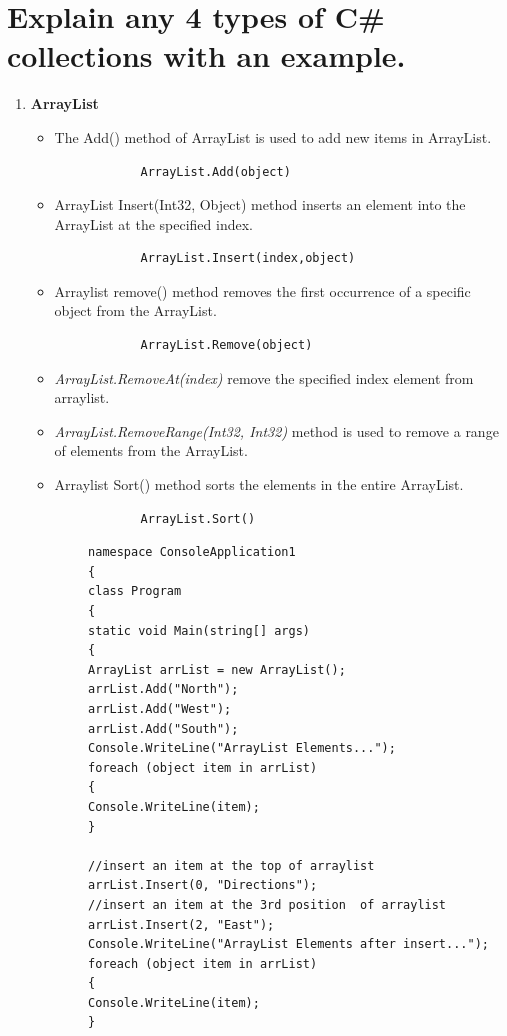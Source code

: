 \documentclass[11pt,dvipsnames,cmyk]{article}
\begin{document}
	 \section*{Explain any 4 types of C\# collections with an example.}
	 \begin{enumerate}
	 	\item \textbf{ArrayList}
	 	\begin{itemize}
	 		\item The Add() method of ArrayList is used to add new items in ArrayList.
	 		\begin{verbatim}
	 		ArrayList.Add(object)
	 		\end{verbatim}
	 		\item ArrayList Insert(Int32, Object) method inserts an element into the ArrayList at the specified index.
	 		\begin{verbatim}
	 		ArrayList.Insert(index,object)
	 		\end{verbatim}
	 		\item Arraylist remove() method removes the first occurrence of a specific object from the ArrayList.
	 		\begin{verbatim}
	 		ArrayList.Remove(object)
	 		\end{verbatim}
	 		\item\emph{ArrayList.RemoveAt(index)} remove the specified index element from arraylist.\\
	 		\item\emph{ArrayList.RemoveRange(Int32, Int32)} method is used to remove a range of elements from the ArrayList.\\
	 		\item Arraylist Sort() method sorts the elements in the entire ArrayList.
	 		\begin{verbatim}
	 		ArrayList.Sort()
	 		\end{verbatim}
	 	\end{itemize}
 		\begin{verbatim}
 		namespace ConsoleApplication1
 		{
 		class Program
 		{
 		static void Main(string[] args)
 		{
 		ArrayList arrList = new ArrayList();
 		arrList.Add("North");
 		arrList.Add("West");
 		arrList.Add("South");
 		Console.WriteLine("ArrayList Elements...");
 		foreach (object item in arrList)
 		{
 		Console.WriteLine(item);
 		}
 		
 		//insert an item at the top of arraylist
 		arrList.Insert(0, "Directions");
 		//insert an item at the 3rd position  of arraylist
 		arrList.Insert(2, "East");
 		Console.WriteLine("ArrayList Elements after insert...");
 		foreach (object item in arrList)
 		{
 		Console.WriteLine(item);
 		}
 		

\end{verbatim}
\end{enumerate}
\end{document}
